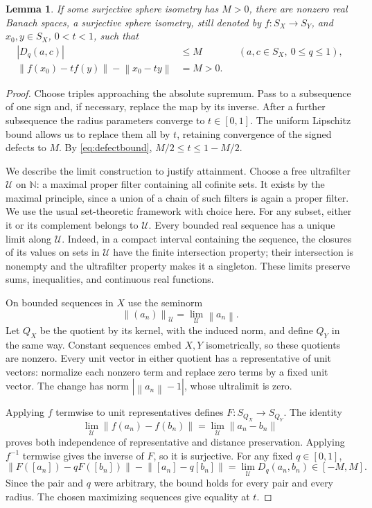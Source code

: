 \documentclass[11pt]{article}
\newtheorem{lemma}[theorem]{Lemma}
\theoremstyle{remark}
\newcommand{\norm}[1]{\left\lVert#1\right\rVert}
\begin{document}
\begin{lemma}\label{lem:attainment}
If some surjective sphere isometry has $M>0$, there are nonzero real Banach spaces, a surjective sphere isometry, still denoted by $f:S_X\to S_Y$, and $x_0,y\in S_X$, $0<t<1$, such that
\begin{equation}\label{eq:maximal}
\begin{aligned}
|D_q(a,c)|&\le M &&(a,c\in S_X,\ 0\le q\le1),\\
\norm{f(x_0)-tf(y)}-\norm{x_0-ty}&=M>0.
\end{aligned}
\end{equation}
\end{lemma}
\begin{proof}
Choose triples approaching the absolute supremum. Pass to a subsequence of one sign and, if necessary, replace the map by its inverse. After a further subsequence the radius parameters converge to $t\in[0,1]$. The uniform Lipschitz bound allows us to replace them all by $t$, retaining convergence of the signed defects to $M$. By \eqref{eq:defectbound}, $M/2\le t\le1-M/2$.

We describe the limit construction to justify attainment. Choose a free ultrafilter $\mathcal U$ on $\mathbb N$: a maximal proper filter containing all cofinite sets. It exists by the maximal principle, since a union of a chain of such filters is again a proper filter. We use the usual set-theoretic framework with choice here. For any subset, either it or its complement belongs to $\mathcal U$. Every bounded real sequence has a unique limit along $\mathcal U$. Indeed, in a compact interval containing the sequence, the closures of its values on sets in $\mathcal U$ have the finite intersection property; their intersection is nonempty and the ultrafilter property makes it a singleton. These limits preserve sums, inequalities, and continuous real functions.

On bounded sequences in $X$ use the seminorm
\[
\norm{(a_n)}_{\mathcal U}=\lim_{\mathcal U}\norm{a_n}.
\]
Let $Q_X$ be the quotient by its kernel, with the induced norm, and define $Q_Y$ in the same way. Constant sequences embed $X,Y$ isometrically, so these quotients are nonzero. Every unit vector in either quotient has a representative of unit vectors: normalize each nonzero term and replace zero terms by a fixed unit vector. The change has norm $|\norm{a_n}-1|$, whose ultralimit is zero.

Applying $f$ termwise to unit representatives defines $F:S_{Q_X}\to S_{Q_Y}$. The identity
\[
\lim_{\mathcal U}\norm{f(a_n)-f(b_n)}
=\lim_{\mathcal U}\norm{a_n-b_n}
\]
proves both independence of representative and distance preservation. Applying $f^{-1}$ termwise gives the inverse of $F$, so it is surjective. For any fixed $q\in[0,1]$,
\[
\norm{F([a_n])-qF([b_n])}-\norm{[a_n]-q[b_n]}
=\lim_{\mathcal U}D_q(a_n,b_n)\in[-M,M].
\]
Since the pair and $q$ were arbitrary, the bound holds for every pair and every radius. The chosen maximizing sequences give equality at $t$.


\end{proof}
\end{document}
